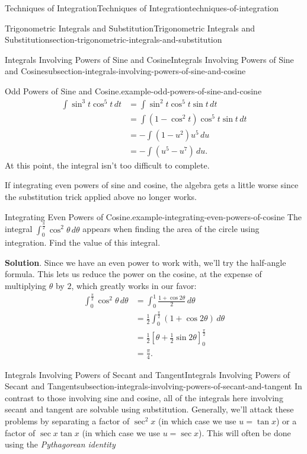 \documentclass[oneside,10pt,]{book}
\numberwithin{equation}{section}
\begin{document}
\begin{chapterptx}{Techniques of Integration}{}{Techniques of Integration}{}{}{techniques-of-integration}
\begin{sectionptx}{Trigonometric Integrals and Substitution}{}{Trigonometric Integrals and Substitution}{}{}{section-trigonometric-integrals-and-substitution}
\begin{subsectionptx}{Integrals Involving Powers of Sine and Cosine}{}{Integrals Involving Powers of Sine and Cosine}{}{}{subsection-integrals-involving-powers-of-sine-and-cosine}
\begin{example}{Odd Powers of Sine and Cosine.}{example-odd-powers-of-sine-and-cosine}
\begin{align*}
\int\sin^{3}t\cos^{5}t\,dt & = \int\sin^{2}t\cos^{5}t\sin t\,dt \\
& = \int(1 - \cos^{2}t)\cos^{5}t\sin t\,dt \\
& = -\int(1 - u^{2})u^{5}\,du \\
& = -\int (u^{5} - u^{7})\,du. 
\end{align*}
\hypertarget{p-527}{}%
At this point, the integral isn't too difficult to complete.%
\end{example}
\hypertarget{p-528}{}%
If integrating even powers of sine and cosine, the algebra gets a little worse since the substitution trick applied above no longer works.%
\begin{example}{Integrating Even Powers of Cosine.}{example-integrating-even-powers-of-cosine}%
\hypertarget{p-529}{}%
The integral \(\int_{0}^{\frac{\pi}{2}}\cos^{2}\theta\,d\theta\) appears when finding the area of the circle using integration. Find the value of this integral.%
\par\smallskip%
\noindent\textbf{Solution}.\hypertarget{solution-116}{}\quad%
\hypertarget{p-530}{}%
Since we have an even power to work with, we'll try the half-angle formula. This lets us reduce the power on the cosine, at the expense of multiplying \(\theta\) by \(2\), which greatly works in our favor:%
%
\begin{align*}
\int_{0}^{\frac{\pi}{2}}\cos^{2}\theta\,d\theta & =\int_{0}^{1}\frac{1 + \cos2\theta}{2}\,d\theta \\
& = \frac{1}{2}\int_{0}^{\frac{\pi}{2}}(1 + \cos2\theta)\,d\theta \\
& = \frac{1}{2}\left[\theta + \frac{1}{2}\sin2\theta\right]_{0}^{\frac{\pi}{2}} \\
& = \frac{\pi}{4}. 
\end{align*}
\end{example}
\end{subsectionptx}
%
%
\typeout{************************************************}
\typeout{************************************************}
%
\begin{subsectionptx}{Integrals Involving Powers of Secant and Tangent}{}{Integrals Involving Powers of Secant and Tangent}{}{}{subsection-integrals-involving-powers-of-secant-and-tangent}
\hypertarget{p-531}{}%
In contrast to those involving sine and cosine, all of the integrals here involving secant and tangent are solvable using substitution. Generally, we'll attack these problems by separating a factor of \(\sec^{2}x\) (in which case we use \(u = \tan x\)) or a factor of \(\sec x\tan x\) (in which case we use \(u = \sec x\)). This will often be done using the \emph{Pythagorean identity}%

\end{subsectionptx}
\end{sectionptx}
\end{chapterptx}
\end{document}
